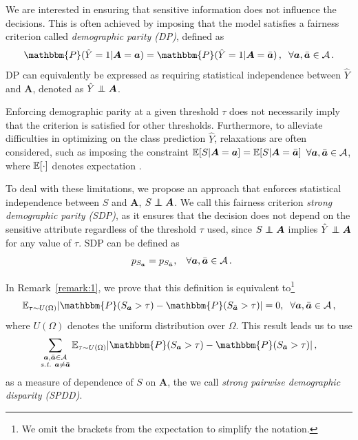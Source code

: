 \documentclass[letterpaper]{article}
\newcommand\independent{\protect\mathpalette{\protect\independenT}{\perp}}
\def\independenT#1#2{\mathrel{\rlap{$#1#2$}\mkern2mu{#1#2}}}
\theoremstyle{definition}
\newcommand{\vA}{\bm{A}}
\newcommand{\Sa}{S_{\va}}
\newcommand{\st}{\emph{s.t.}}
\begin{document}
We are interested in ensuring that sensitive information does not influence the decisions. 
This is often achieved by imposing that the model satisfies a fairness criterion called \emph{demographic parity (DP)}, defined as
\begin{align*}
\mathbbm{P}(\hat Y = 1 | \vA = \va) = \mathbbm{P}(\hat Y = 1 | \vA = \bar\va)\,, \hskip0.2cm \forall \va,\bar\va \in \mathcal{A} \,.
\end{align*}
DP can equivalently be expressed as requiring statistical independence between $\hat Y$ and $\vA$, denoted as $\hat Y \independent \vA$.

Enforcing demographic parity at a given threshold $\tau$ does not necessarily imply that the criterion is satisfied for other thresholds. 
Furthermore, to alleviate difficulties in optimizing on the class prediction $\hat Y$, relaxations are often considered, such as imposing the constraint $\E[S|\vA=\va]=\E[S| \vA = \bar\va]$ $\forall {\bm{a}},\bar{{\bm{a}}} \in \mathcal{A}$, where $\mathbb{E}[\cdot]$ denotes expectation \citep{goh16satisfying,zafar17fairness}.

To deal with these limitations, we propose an approach that enforces statistical independence between $S$ and $\vA$, $S \independent \vA$. We call this fairness criterion \emph{strong demographic parity (SDP)}, as it ensures that the decision does not depend on the sensitive attribute regardless of the threshold $\tau$ used, since $S\independent \vA$ implies $\hat Y\independent \vA$ for any value of $\tau$. 
SDP can be defined as 
\begin{align*}
\hskip0.2cm p_{\Sa} = p_{S_{\bar\va}}, \hskip0.3cm \forall \va,\bar\va\in \mathcal{A} \,.
\end{align*}

In Remark~\ref{remark:1}, we prove that this definition is equivalent to\footnote{We omit the brackets from the expectation to simplify the notation.} 
$$\mathbb{E}_{\tau\sim U(\Omega)} |\mathbbm{P}(S_{\va}>\tau) - \mathbbm{P}(S_{\bar\va}>\tau)| = 0, \hskip0.2cm\forall \va,\bar\va\in \mathcal{A}\,,$$
where $U(\Omega)$ denotes the uniform distribution over $\Omega$. This result leads us to use 
\begin{align*}
\sum_{\substack{\va,\bar\va\in \mathcal{A} \\ \st~\va\neq \bar\va}} \mathbb{E}_{\tau\sim U(\Omega)} |\mathbbm{P}(S_{\va}>\tau) - \mathbbm{P}(S_{\bar\va} > \tau)|\,,
\end{align*}
as a measure of dependence of $S$ on $\vA$, the we call \emph{strong pairwise demographic disparity (SPDD)}.  
\end{document}
